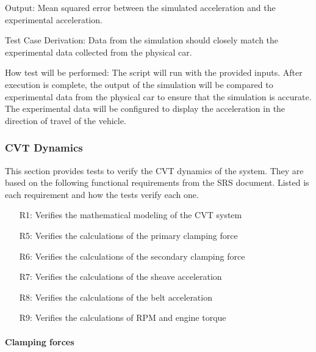 \documentclass[12pt, titlepage]{article}
\begin{document}
\begin{enumerate}
  Output: Mean squared error between the simulated acceleration and the experimental acceleration.

  Test Case Derivation: Data from the simulation should closely match the experimental data collected from the physical car.

  How test will be performed: The script will run with the provided inputs. After execution is complete, the output of the simulation will be compared to experimental data from the physical car to ensure that the simulation is accurate. The experimental data will be configured to display the acceleration in the direction of travel of the vehicle.

\end{enumerate}

\subsubsection{CVT Dynamics}

This section provides tests to verify the CVT dynamics of the system.
They are based on the following functional requirements from the SRS document.
Listed is each requirement and how the tests verify each one.
\begin{itemize}
  \item [R1:] Verifies the mathematical modeling of the CVT system
  \item [R5:] Verifies the calculations of the primary clamping force
  \item [R6:] Verifies the calculations of the secondary clamping force
  \item [R7:] Verifies the calculations of the sheave acceleration
  \item [R8:] Verifies the calculations of the belt acceleration
  \item [R9:] Verifies the calculations of RPM and engine torque
\end{itemize}

\paragraph{Clamping forces}
\end{document}
